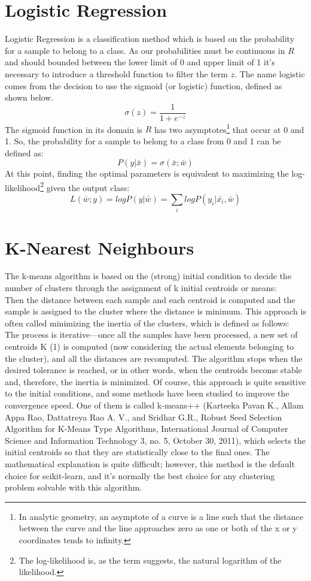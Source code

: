 \documentclass[12pt]{article}
\begin{document}
\newpage
\section{Logistic Regression}
Logistic Regression is a classification method which is based on the probability for a sample to belong to a class. As our probabilities must be continuous in $R$ and should bounded between the lower limit of 0 and upper limit of 1 it's necessary to introduce a threshold function to filter the term $z$. The name logistic comes from the decision to use the sigmoid (or logistic) function, defined as shown below.
$$\sigma(z)= \dfrac{1}{1+e^{-z}}$$
The sigmoid function in its domain is $R$ has two asymptotes\footnote{In analytic geometry, an asymptote of a curve is a line such that the distance between the curve and the line approaches zero as one or both of the x or y coordinates tends to infinity.} that occur at 0 and 1. So, the probability for a sample to belong to a class from 0 and 1 can be defined as:
$$P(y|\bar{x})=\sigma(\bar{x};\bar{w})$$
At this point, finding the optimal parameters is equivalent to maximizing the log-likelihood\footnote{The log-likelihood is, as the term suggests, the natural logarithm of the likelihood.}
given the output class:
$$L(\bar{w};y) = log P(y|\bar{w}) = \sum_{i} log P(y_{i}|\bar{x_{i}}, \bar{w})$$


\newpage
\section{K-Nearest Neighbours}
The k-means algorithm is based on the (strong) initial condition to decide the number of clusters through the assignment of k initial centroids or means:
\\
Then the distance between each sample and each centroid is computed and the sample is
assigned to the cluster where the distance is minimum. This approach is often called
minimizing the inertia of the clusters, which is defined as follows:
\\
The process is iterative—once all the samples have been processed, a new set of centroids K (1) is computed (now considering the actual elements belonging to the cluster), and all the distances are recomputed. The algorithm stops when the desired tolerance is reached, or in other words, when the centroids become stable and, therefore, the inertia is minimized. Of course, this approach is quite sensitive to the initial conditions, and some methods have been studied to improve the convergence speed. One of them is called k-means++ (Karteeka Pavan K., Allam Appa Rao, Dattatreya Rao A. V., and Sridhar G.R., Robust Seed Selection Algorithm for K-Means Type Algorithms, International Journal of Computer Science and Information Technology 3, no. 5, October 30, 2011), which selects the initial centroids so that they are statistically close to the final ones. The mathematical explanation is quite difficult; however, this method is the default choice for scikit-learn, and it's normally the best choice for any clustering problem solvable with this algorithm.
\end{document}
